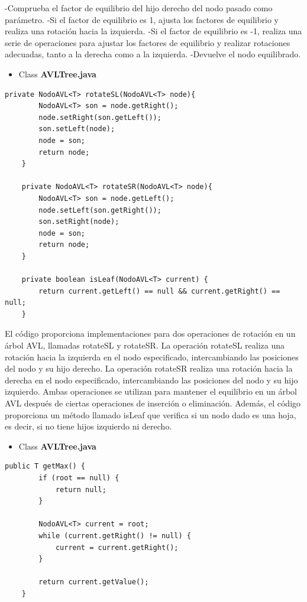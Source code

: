 \documentclass{article}
\begin{document}
-Comprueba el factor de equilibrio del hijo derecho del nodo pasado como parámetro.
-Si el factor de equilibrio es 1, ajusta los factores de equilibrio y realiza una rotación hacia la izquierda.
-Si el factor de equilibrio es -1, realiza una serie de operaciones para ajustar los factores de equilibrio y realizar rotaciones adecuadas, tanto a la derecha como a la izquierda.
-Devuelve el nodo equilibrado.
\begin{itemize}
        \item Class \textbf{AVLTree.java}
    \end{itemize}
    \begin{lstlisting}[caption={\textbf{Parte 2:}}]
	private NodoAVL<T> rotateSL(NodoAVL<T> node){
		NodoAVL<T> son = node.getRight();
		node.setRight(son.getLeft());
		son.setLeft(node);
		node = son;
		return node;
	}
	
	private NodoAVL<T> rotateSR(NodoAVL<T> node){
		NodoAVL<T> son = node.getLeft();
		node.setLeft(son.getRight());
		son.setRight(node);
		node = son;
		return node;
	}

	private boolean isLeaf(NodoAVL<T> current) {
		return current.getLeft() == null && current.getRight() == null;
	}
         \end{lstlisting}
El código proporciona implementaciones para dos operaciones de rotación en un árbol AVL, llamadas rotateSL y rotateSR. La operación rotateSL realiza una rotación hacia la izquierda en el nodo especificado, intercambiando las posiciones del nodo y su hijo derecho. La operación rotateSR realiza una rotación hacia la derecha en el nodo especificado, intercambiando las posiciones del nodo y su hijo izquierdo. Ambas operaciones se utilizan para mantener el equilibrio en un árbol AVL después de ciertas operaciones de inserción o eliminación. Además, el código proporciona un método llamado isLeaf que verifica si un nodo dado es una hoja, es decir, si no tiene hijos izquierdo ni derecho.
\begin{itemize}
        \item Class \textbf{AVLTree.java}
    \end{itemize}
    \begin{lstlisting}[caption={\textbf{Parte 2:}}]
	public T getMax() {
		if (root == null) {
			return null;
		}

		NodoAVL<T> current = root;
		while (current.getRight() != null) {
			current = current.getRight();
		}

		return current.getValue();
	}
         \end{lstlisting}
\end{document}
